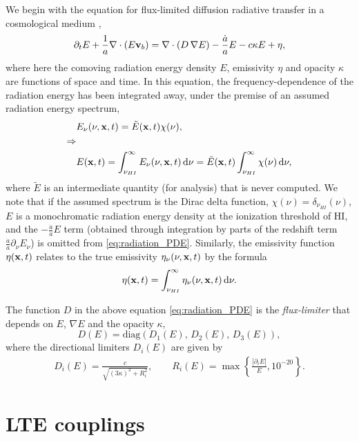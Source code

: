\documentclass[letterpaper,10pt]{article}
\renewcommand{\(}{\left(}
\renewcommand{\)}{\right)}
\newcommand{\vb}{{\bf v}_b}
\newcommand{\xvec}{{\bf x}}
\begin{document}
We begin with the equation for flux-limited diffusion radiative
transfer in a cosmological medium \cite{ReynoldsHayesPaschosNorman2009},
\begin{equation}
\label{eq:radiation_PDE}
  \partial_{t} E + \frac1a \nabla\cdot\(E\vb\) =
    \nabla\cdot\(D\,\nabla E\) - \frac{\dot{a}}{a} E - c\kappa E + \eta,
\end{equation}
where here the comoving radiation energy density $E$, emissivity
$\eta$ and opacity $\kappa$ are functions of space and time.  In this
equation, the frequency-dependence of the radiation energy has been
integrated away, under the premise of an assumed radiation energy
spectrum, 
\begin{align}
  \notag
  & E_{\nu}(\nu,\xvec,t) = \tilde{E}(\xvec,t) \chi(\nu), \\
  \notag
  \Rightarrow & \\
  \label{eq:spectrum}
  & E(\xvec,t) = \int_{\nu_{HI}}^{\infty} E_{\nu}(\nu,\xvec,t)\,\mathrm{d}\nu 
    = \tilde{E}(\xvec,t) \int_{\nu_{HI}}^{\infty} \chi(\nu)\,\mathrm{d}\nu,
\end{align}
where $\tilde{E}$ is an intermediate quantity (for analysis) that is
never computed.  We note that if the assumed spectrum is the Dirac
delta function, $\chi(\nu) = \delta_{\nu_{HI}}(\nu)$, $E$ is a
monochromatic radiation energy density at the ionization threshold of
HI, and the $-\frac{\dot{a}}{a}E$ term (obtained through integration
by parts of the redshift term
$\frac{\dot{a}}{a}\partial_{\nu}E_{\nu}$) is omitted from
\eqref{eq:radiation_PDE}. Similarly, the emissivity function
$\eta(\xvec,t)$ relates to the true emissivity 
$\eta_{\nu}(\nu,\xvec,t)$ by the formula
\begin{equation}
\label{eq:emissivity}
  \eta(\xvec,t) = \int_{\nu_{HI}}^{\infty}\eta_{\nu}(\nu,\xvec,t)\,\mathrm{d}\nu.
\end{equation}

The function $D$ in the above equation \eqref{eq:radiation_PDE} is
the {\em flux-limiter} that depends on $E$, $\nabla E$ and the 
opacity $\kappa$,  
\[
   D(E) = \text{diag}\( D_1(E),\, D_2(E),\, D_3(E) \),
\]
where the directional limiters $D_i(E)$ are given by \cite{Morel2000}
\begin{align}
  \label{eq:Larsen_limiter}
   D_i(E) = \frac{c}{\sqrt{(3\kappa)^2 + R_i^2}}, \qquad
   R_i(E) = \max\left\{\frac{|\partial_i E|}{E}, 10^{-20} \right\}.
\end{align}




\section{LTE couplings}
\label{sec:lte_model}
\end{document}
